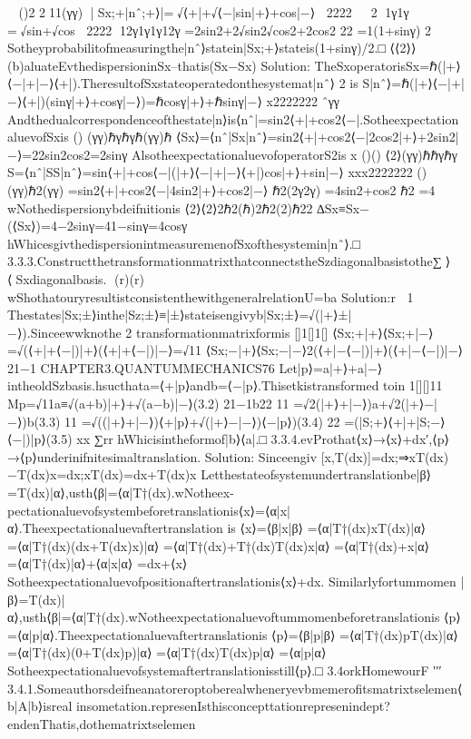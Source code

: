 {{
()2
211(γγ)
|⟨Sx;+|nˆ;+⟩|=√⟨+|+√⟨−|sin|+⟩+cos|−⟩
2222

2
1γ1γ
=√sin+√cos
2222
12γ1γ1γ12γ
=2sin2+2√sin2√cos2+2cos2
22
=1(1+sinγ)
2
Sotheyprobabilitofmeasuringthe|nˆ⟩statein|Sx;+⟩stateis(1+sinγ)/2.□
⟨⟨2⟩⟩
(b)aluateEvthedispersioninSx–thatis(Sx−Sx)
Solution:
TheSxoperatorisSx=ℏ(|+⟩⟨−|+|−⟩⟨+|).TheresultofSxstateoperatedonthesystemat|nˆ⟩
2
is
S|nˆ⟩=ℏ(|+⟩⟨−|+|−⟩⟨+|)(sinγ|+⟩+cosγ|−⟩)=ℏcosγ|+⟩+ℏsinγ|−⟩
x2222222
ˆγγ
Andthedualcorrespondenceofthestate|n⟩is⟨nˆ|=sin2⟨+|+cos2⟨−|.Sotheexpectation
aluevofSxis
()
(γγ)ℏγℏγℏ(γγ)ℏ
⟨Sx⟩=⟨nˆ|Sx|nˆ⟩=sin2⟨+|+cos2⟨−|2cos2|+⟩+2sin2|−⟩=22sin2cos2=2sinγ
AlsotheexpectationaluevofoperatorS2is
x
()()
⟨2⟩(γγ)ℏℏγℏγ
S=⟨nˆ|SS|nˆ⟩=sin⟨+|+cos⟨−|(|+⟩⟨−|+|−⟩⟨+|)cos|+⟩+sin|−⟩
xxx2222222
()
(γγ)ℏ2(γγ)
=sin2⟨+|+cos2⟨−|4sin2|+⟩+cos2|−⟩
ℏ2(2γ2γ)
=4sin2+cos2
ℏ2
=4
wNothedispersionybdeifnitionis
⟨2⟩⟨2⟩2ℏ2(ℏ)2ℏ2(2)ℏ22
∆Sx≡Sx−(⟨Sx⟩)=4−2sinγ=41−sinγ=4cosγ
hWhicesgivthedispersionintmeasuremenofSxofthesystemin|nˆ⟩.□
3.3.3.ConstructthetransformationmatrixthatconnectstheSzdiagonalbasistothe∑⟩⟨Sxdiagonalbasis.
(r)(r)
wShothatouryresultistconsistenthewithgeneralrelationU=ba
Solution:r
1
Thestates|Sx;±⟩inthe|Sz;±⟩≡|±⟩stateisengivyb|Sx;±⟩=√(|+⟩±|−⟩).Sinceewwknothe
2
transformationmatrixformis
[]1[]1[]
⟨Sx;+|+⟩⟨Sx;+|−⟩=√(⟨+|+⟨−|)|+⟩(⟨+|+⟨−|)|−⟩=√11
⟨Sx;−|+⟩⟨Sx;−|−⟩2(⟨+|−⟨−|)|+⟩(⟨+|−⟨−|)|−⟩21−1
CHAPTER3.QUANTUMMECHANICS76
Let|p⟩=a|+⟩+a|−⟩intheoldSzbasis.hsucthata=⟨+|p⟩andb=⟨−|p⟩.Thisetkistransformed
toin
1[][]11
Mp=√11a≡√(a+b)|+⟩+√(a−b)|−⟩(3.2)
21−1b22
11
=√2(|+⟩+|−⟩)a+√2(|+⟩−|−⟩)b(3.3)
11
=√((|+⟩+|−⟩)⟨+|p⟩+√(|+⟩−|−⟩)⟨−|p⟩)(3.4)
22
=(|S;+⟩⟨+|+|S;−⟩⟨−|)|p⟩(3.5)
xx
∑rr
hWhicisintheformof|b⟩⟨a|.□
3.3.4.evProthat⟨x⟩→⟨x⟩+dx′,⟨p⟩→⟨p⟩underinifnitesimaltranslation.
Solution:
Sinceengiv
[x,T(dx)]=dx;⇒xT(dx)−T(dx)x=dx;xT(dx)=dx+T(dx)x
Letthestateofsystemundertranslationbe|β⟩=T(dx)|α⟩,usth⟨β|=⟨α|T†(dx).wNotheex-
pectationaluevofsystembeforetranslationis⟨x⟩=⟨α|x|α⟩.Theexpectationaluevaftertranslation
is
⟨x⟩=⟨β|x|β⟩
=⟨α|T†(dx)xT(dx)|α⟩
=⟨α|T†(dx)(dx+T(dx)x)|α⟩
=⟨α|T†(dx)+T†(dx)T(dx)x|α⟩
=⟨α|T†(dx)+x|α⟩
=⟨α|T†(dx)|α⟩+⟨α|x|α⟩
=dx+⟨x⟩
Sotheexpectationaluevofpositionaftertranslationis⟨x⟩+dx.
Similarlyfortummomen
|β⟩=T(dx)|α⟩,usth⟨β|=⟨α|T†(dx).wNotheexpectationaluevoftummomenbeforetranslationis
⟨p⟩=⟨α|p|α⟩.Theexpectationaluevaftertranslationis
⟨p⟩=⟨β|p|β⟩
=⟨α|T†(dx)pT(dx)|α⟩
=⟨α|T†(dx)(0+T(dx)p)|α⟩
=⟨α|T†(dx)T(dx)p|α⟩
=⟨α|p|α⟩
Sotheexpectationaluevofsystemaftertranslationisstill⟨p⟩.□
3.4orkHomewourF
′′′
3.4.1.Someauthorsdeifneanatoreroptoberealwheneryevbmemerofitsmatrixtselemen⟨b|A|b⟩isreal
insometation.represenIsthisconcepttationrepresenindept?endenThatis,dothematrixtselemen
}}
